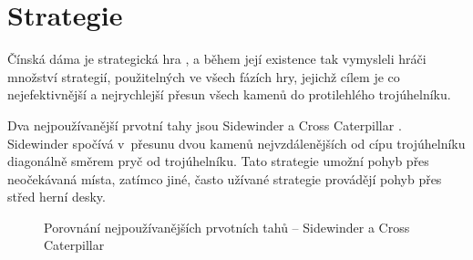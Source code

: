 \section{Strategie}
\label{sec:Strategie}
Čínská dáma je strategická hra \cite{strategie}, a během její existence tak vymysleli hráči množství strategií, použitelných ve všech fázích hry, jejichž cílem je co nejefektivnější a nejrychlejší přesun všech kamenů do protilehlého trojúhelníku.

Dva nejpoužívanější prvotní tahy jsou Sidewinder a Cross Caterpillar \cite{strategie}. Sidewinder spočívá v~přesunu dvou kamenů nejvzdálenějších od cípu trojúhelníku diagonálně směrem pryč od trojúhelníku. Tato strategie umožní pohyb přes neočekávaná místa, zatímco jiné, často užívané strategie provádějí pohyb přes střed herní desky.

\begin{figure}
	\centering
	\hspace{3em} %
	\caption{Porovnání nejpoužívanějších prvotních tahů -- Sidewinder a Cross Caterpillar}
	\label{fig:PrvotniTahy}
\end{figure}

